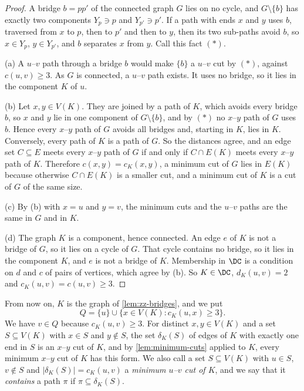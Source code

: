\begin{proof}
A bridge $b = pp'$ of the connected graph $G$ lies on no cycle, and $G \setminus \{b\}$ has exactly two components $Y_p \ni p$ and $Y_{p'} \ni p'$.
If a path with ends $x$ and $y$ uses $b$, traversed from $x$ to $p$, then to $p'$ and then to $y$, then its two sub-paths avoid $b$, so $x \in Y_p$, $y \in Y_{p'}$, and $b$ separates $x$ from $y$.
Call this fact $(*)$.

(a) A $u$--$v$ path through a bridge $b$ would make $\{b\}$ a $u$--$v$ cut by $(*)$, against $c(u, v) \geq 3$.
As $G$ is connected, a $u$--$v$ path exists.
It uses no bridge, so it lies in the component $K$ of $u$.

(b) Let $x, y \in V(K)$.
They are joined by a path of $K$, which avoids every bridge $b$, so $x$ and $y$ lie in one component of $G \setminus \{b\}$, and by $(*)$ no $x$--$y$ path of $G$ uses $b$.
Hence every $x$--$y$ path of $G$ avoids all bridges and, starting in $K$, lies in $K$.
Conversely, every path of $K$ is a path of $G$.
So the distances agree, and an edge set $C \subseteq E$ meets every $x$--$y$ path of $G$ if and only if $C \cap E(K)$ meets every $x$--$y$ path of $K$.
Therefore $c(x, y) = c_K(x, y)$, a minimum cut of $G$ lies in $E(K)$ because otherwise $C \cap E(K)$ is a smaller cut, and a minimum cut of $K$ is a cut of $G$ of the same size.

(c) By (b) with $x = u$ and $y = v$, the minimum cuts and the $u$--$v$ paths are the same in $G$ and in $K$.

(d) The graph $K$ is a component, hence connected.
An edge $e$ of $K$ is not a bridge of $G$, so it lies on a cycle of $G$.
That cycle contains no bridge, so it lies in the component $K$, and $e$ is not a bridge of $K$.
Membership in $\DC$ is a condition on $d$ and $c$ of pairs of vertices, which agree by (b).
So $K \in \DC$, $d_K(u, v) = 2$ and $c_K(u, v) = c(u, v) \geq 3$.
\end{proof}

From now on, $K$ is the graph of \cref{lem:zz-bridges}, and we put
\[
Q = \{u\} \cup \{x \in V(K) : c_K(u, x) \geq 3\}.
\]
We have $v \in Q$ because $c_K(u, v) \geq 3$.
For distinct $x, y \in V(K)$ and a set $S \subseteq V(K)$ with $x \in S$ and $y \notin S$, the set $\delta_K(S)$ of edges of $K$ with exactly one end in $S$ is an $x$--$y$ cut of $K$, and by \cref{lem:minimum-cuts} applied to $K$, every minimum $x$--$y$ cut of $K$ has this form.
We also call a set $S \subseteq V(K)$ with $u \in S$, $v \notin S$ and $|\delta_K(S)| = c_K(u, v)$ a \emph{minimum $u$--$v$ cut of $K$}, and we say that it \emph{contains} a path $\pi$ if $\pi \subseteq \delta_K(S)$.

